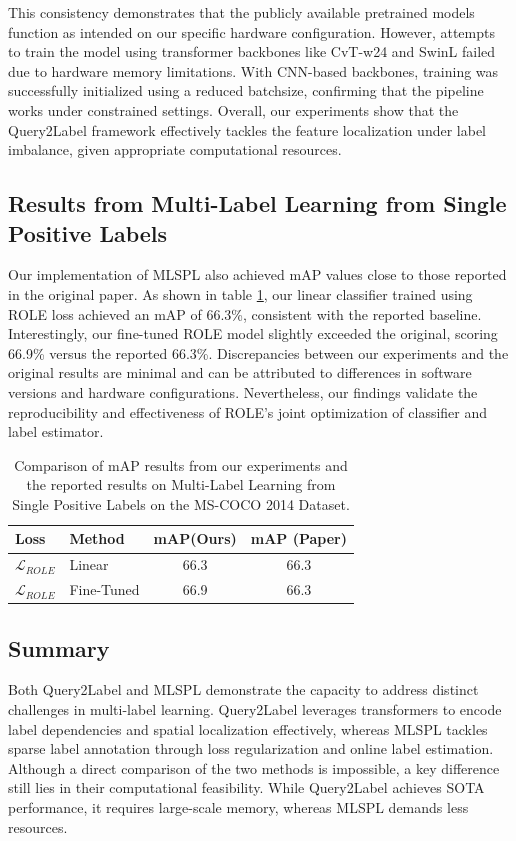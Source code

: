 \documentclass[lettersize,journal]{IEEEtran}
\begin{document}
This consistency demonstrates that the publicly available pretrained models function as intended on our specific hardware configuration. However, attempts to train the model using transformer backbones like CvT-w24 and SwinL failed due to hardware memory limitations. With CNN-based backbones, training was successfully initialized using a reduced batchsize, confirming that the pipeline works under constrained settings. Overall, our experiments show that the Query2Label framework effectively tackles the feature localization under label imbalance, given appropriate computational resources.



\subsection{Results from Multi-Label Learning from Single Positive Labels}
Our implementation of MLSPL also achieved mAP values close to those reported in the original paper. As shown in table \ref{tab:MLSPL_map_comparison}, our linear classifier trained using ROLE loss achieved an mAP of 66.3\%, consistent with the reported baseline. Interestingly, our fine-tuned ROLE model slightly exceeded the original, scoring 66.9\% versus the reported 66.3\%. Discrepancies between our experiments and the original results are minimal and can be attributed to differences in software versions and hardware configurations. Nevertheless, our findings validate the reproducibility and effectiveness of ROLE's joint optimization of classifier and label estimator.

\begin{table}[H]
    \small
    \caption{Comparison of mAP results from our experiments and the reported results on Multi-Label Learning from Single Positive Labels on the MS-COCO 2014 Dataset.}
    \label{tab:MLSPL_map_comparison}
    \centering
    \begin{tabular}{l l c c}
    \toprule
    \textbf{Loss} & \textbf{Method} & \textbf{mAP(Ours)} & \textbf{mAP (Paper)} \\
    \midrule
    $\mathcal{L}_{ROLE}$ & Linear & 66.3 & 66.3 \\
    $\mathcal{L}_{ROLE}$ & Fine-Tuned & 66.9 & 66.3 \\
    \bottomrule
    \end{tabular}
\end{table}

\subsection{Summary}
Both Query2Label and MLSPL demonstrate the capacity to address distinct challenges in multi-label learning. Query2Label leverages transformers to encode label dependencies and spatial localization effectively, whereas MLSPL tackles sparse label annotation through loss regularization and online label estimation. Although a direct comparison of the two methods is impossible, a key difference still lies in their computational feasibility. While Query2Label achieves SOTA performance, it requires large-scale memory, whereas MLSPL demands less resources.
\end{document}
